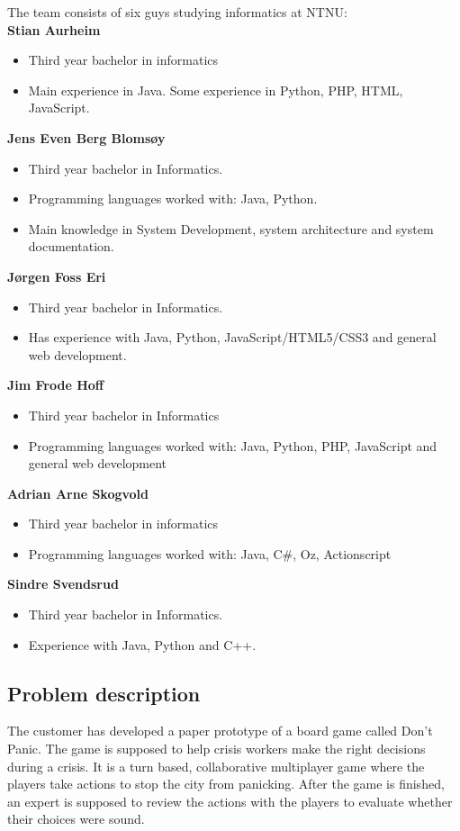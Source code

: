 The team consists of six guys studying informatics at NTNU:\\
\textbf{Stian Aurheim}
\begin{itemize} \setlength{\itemsep}{0cm}\setlength{\parskip}{0cm}%
	\item Third year bachelor in informatics
	\item Main experience in Java. Some experience in Python, PHP, HTML, JavaScript.
\end{itemize} 
\textbf{Jens Even Berg Blomsøy}
\begin{itemize} \setlength{\itemsep}{0cm}\setlength{\parskip}{0cm}%
	\item Third year bachelor in Informatics. 
	\item Programming languages worked with: Java, Python.
	\item Main knowledge in System Development, system architecture and system documentation.
\end{itemize}
\textbf{Jørgen Foss Eri}
\begin{itemize} \setlength{\itemsep}{0cm}\setlength{\parskip}{0cm}%
	\item Third year bachelor in Informatics. 
	\item Has experience with Java, Python, JavaScript/HTML5/CSS3 and general web development.
\end{itemize}
\textbf{Jim Frode Hoff}
\begin{itemize} \setlength{\itemsep}{0cm}\setlength{\parskip}{0cm}%
	\item Third year bachelor in Informatics
	\item Programming languages worked with: Java, Python, PHP, JavaScript and general web development
\end{itemize}
\textbf{Adrian Arne Skogvold}
\begin{itemize} \setlength{\itemsep}{0cm}\setlength{\parskip}{0cm}%
	\item Third year bachelor in informatics
	\item Programming languages worked with: Java, C\#, Oz, Actionscript
\end{itemize}
\textbf{Sindre Svendsrud}
\begin{itemize} \setlength{\itemsep}{0cm}\setlength{\parskip}{0cm}%
	\item Third year bachelor in Informatics. 
	\item Experience with Java, Python and C++.
\end{itemize}

\subsection{Problem description}
The customer has developed a paper prototype of a board game called Don’t Panic. The game is supposed to help crisis workers make the right decisions during a crisis. It is a turn based, collaborative multiplayer game where the players take actions to stop the city from panicking. After the game is finished, an expert is supposed to review the actions with the players to evaluate whether their choices were sound. 

